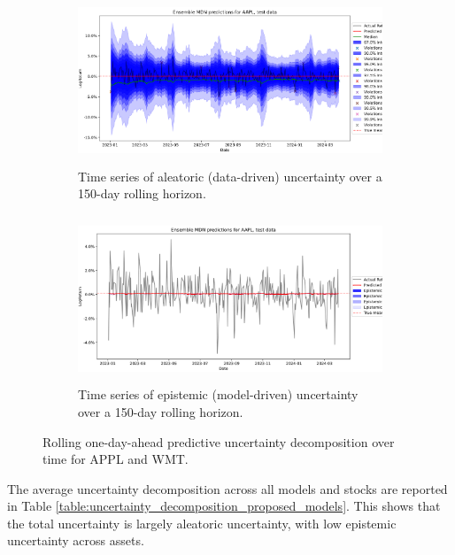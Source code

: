 \begin{figure}[H]
    \centering
    \begin{subfigure}[b]{0.49\textwidth}
        \centering
        \includegraphics[width=\linewidth, height=5cm]{Images/Results/APPL_aleatoric_uncertainty_time_series_example_1.png}
        \caption{Time series of aleatoric (data-driven) uncertainty  over a 150-day rolling horizon.}
        \label{fig:aleatoric_uncertainty_time_series}
    \end{subfigure}
    \hfill
    \begin{subfigure}[b]{0.49\textwidth}
        \centering
        \includegraphics[width=\linewidth, height=5cm]{Images/Results/APPL_epistemic_uncertainty_time_series_example_1.png}
        \caption{Time series of epistemic (model-driven) uncertainty  over a 150-day rolling horizon.}
        \label{fig:epistemic_uncertainty_time_series}
    \end{subfigure}
    \caption{Rolling one-day-ahead predictive uncertainty decomposition over time for APPL and WMT.}
    \label{fig:uncertainty_time_series_decomposition}
\end{figure}

The average uncertainty decomposition across all models and stocks are reported in Table \ref{table:uncertainty_decomposition_proposed_models}. This shows that the total uncertainty is largely aleatoric uncertainty, with low epistemic uncertainty across assets. 


